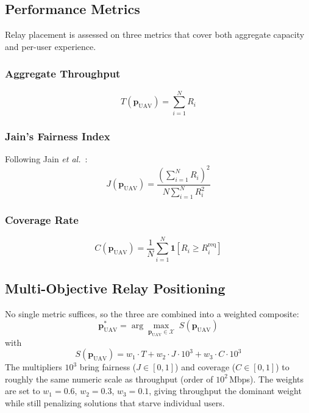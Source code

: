 \documentclass[journal]{IEEEtran}
\begin{document}
\subsection{Performance Metrics}

Relay placement is assessed on three metrics that cover both aggregate capacity and per-user experience.

\subsubsection{Aggregate Throughput}
\begin{equation}
    T(\mathbf{p}_\text{UAV}) = \sum_{i=1}^{N} R_i
\end{equation}

\subsubsection{Jain's Fairness Index}
Following Jain \textit{et al.}~\cite{jain1984}:
\begin{equation}
    J(\mathbf{p}_\text{UAV}) = \frac{\left(\sum_{i=1}^{N} R_i\right)^2}{N \sum_{i=1}^{N} R_i^2}
\end{equation}

\subsubsection{Coverage Rate}
\begin{equation}
    C(\mathbf{p}_\text{UAV}) = \frac{1}{N} \sum_{i=1}^{N} \mathbf{1}[R_i \geq R_i^\text{req}]
\end{equation}

\subsection{Multi-Objective Relay Positioning}

No single metric suffices, so the three are combined into a weighted composite:
\begin{equation}
    \mathbf{p}_\text{UAV}^* = \arg\max_{\mathbf{p}_\text{UAV} \in \mathcal{X}} \; S(\mathbf{p}_\text{UAV})
    \label{eq:objective}
\end{equation}
with
\begin{equation}
    S(\mathbf{p}_\text{UAV}) = w_1 \cdot T + w_2 \cdot J \cdot 10^3 + w_3 \cdot C \cdot 10^3
    \label{eq:score}
\end{equation}
The multipliers $10^3$ bring fairness ($J \in [0,1]$) and coverage ($C \in [0,1]$) to roughly the same numeric scale as throughput (order of $10^2$\,Mbps). The weights are set to $w_1 = 0.6$, $w_2 = 0.3$, $w_3 = 0.1$, giving throughput the dominant weight while still penalizing solutions that starve individual users.
\end{document}
